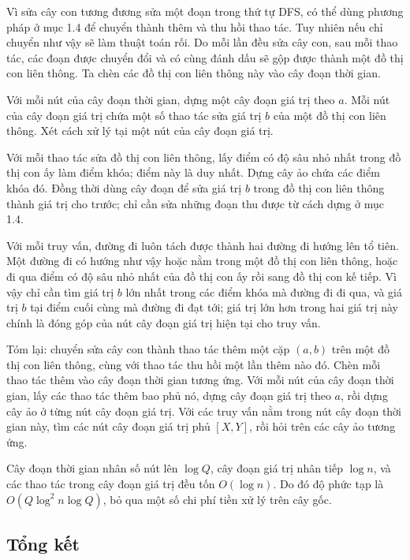 \documentclass[11pt]{article}
\begin{document}
Vì sửa cây con tương đương sửa một đoạn trong thứ tự DFS, có thể dùng phương
pháp ở mục 1.4 để chuyển thành thêm và thu hồi thao tác. Tuy nhiên nếu chỉ
chuyển như vậy sẽ làm thuật toán rối. Do mỗi lần đều sửa cây con, sau mỗi
thao tác, các đoạn được chuyển đổi và có cùng đánh dấu sẽ gộp được thành một
đồ thị con liên thông. Ta chèn các đồ thị con liên thông này vào cây đoạn thời
gian.

Với mỗi nút của cây đoạn thời gian, dựng một cây đoạn giá trị theo \(a\). Mỗi
nút của cây đoạn giá trị chứa một số thao tác sửa giá trị \(b\) của một đồ
thị con liên thông. Xét cách xử lý tại một nút của cây đoạn giá trị.

Với mỗi thao tác sửa đồ thị con liên thông, lấy điểm có độ sâu nhỏ nhất trong
đồ thị con ấy làm điểm khóa; điểm này là duy nhất. Dựng cây ảo chứa các điểm
khóa đó. Đồng thời dùng cây đoạn để sửa giá trị \(b\) trong đồ thị con liên
thông thành giá trị cho trước; chỉ cần sửa những đoạn thu được từ cách dựng ở
mục 1.4.

Với mỗi truy vấn, đường đi luôn tách được thành hai đường đi hướng lên tổ
tiên. Một đường đi có hướng như vậy hoặc nằm trong một đồ thị con liên thông,
hoặc đi qua điểm có độ sâu nhỏ nhất của đồ thị con ấy rồi sang đồ thị con kế
tiếp. Vì vậy chỉ cần tìm giá trị \(b\) lớn nhất trong các điểm khóa mà đường
đi đi qua, và giá trị \(b\) tại điểm cuối cùng mà đường đi đạt tới; giá trị lớn
hơn trong hai giá trị này chính là đóng góp của nút cây đoạn giá trị hiện tại
cho truy vấn.

Tóm lại: chuyển sửa cây con thành thao tác thêm một cặp \((a,b)\) trên một đồ
thị con liên thông, cùng với thao tác thu hồi một lần thêm nào đó. Chèn mỗi
thao tác thêm vào cây đoạn thời gian tương ứng. Với mỗi nút của cây đoạn thời
gian, lấy các thao tác thêm bao phủ nó, dựng cây đoạn giá trị theo \(a\), rồi
dựng cây ảo ở từng nút cây đoạn giá trị. Với các truy vấn nằm trong nút cây
đoạn thời gian này, tìm các nút cây đoạn giá trị phủ \([X,Y]\), rồi hỏi trên
các cây ảo tương ứng.

Cây đoạn thời gian nhân số nút lên \(\log Q\), cây đoạn giá trị nhân tiếp
\(\log n\), và các thao tác trong cây đoạn giá trị đều tốn \(O(\log n)\). Do
đó độ phức tạp là \(O(Q\log^2 n\log Q)\), bỏ qua một số chi phí tiền xử lý trên
cây gốc.

\subsection{Tổng kết}
\end{document}
